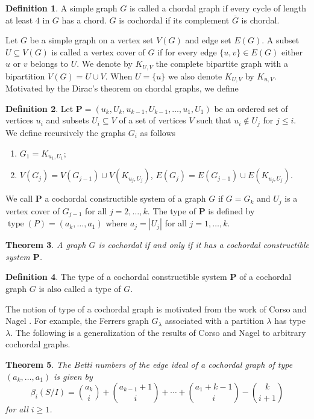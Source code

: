 \documentclass[12pt,amscd]{amsart}
\newtheorem{thm}{Theorem}[section]
\theoremstyle{definition}
\newtheorem{defn}[thm]{Definition}
\numberwithin{equation}{section}
\DeclareMathOperator{\type}{type}
\def\P {\mathbf P}
\begin{document}
\begin{defn}
    A simple graph $G$ is called a chordal graph if every cycle of length at least $4$ in $G$ has a chord. $G$ is cochordal if its complement $\overline{G}$ is chordal.
\end{defn}
Let $G$ be a simple graph on a vertex set $V(G)$ and edge set $E(G)$. A subset $U \subseteq V(G)$ is called a vertex cover of $G$ if for every edge $\{u,v\} \in E(G)$ either $u$ or $v$ belongs to $U$. We denote by $K_{U,V}$ the complete bipartite graph with a bipartition $V(G) = U \cup V$. When $U = \{u\}$ we also denote $K_{U,V}$ by $K_{u,V}$. Motivated by the Dirac's theorem \cite{Di} on chordal graphs, we define
\begin{defn} Let $\P = (u_k,U_k, u_{k-1}, U_{k-1}, \ldots, u_1, U_1)$ be an ordered set of vertices $u_i$ and subsets $U_i \subseteq V$ of a set of vertices $V$ such that $u_i \notin U_j$ for $j \le i$. We define recursively the graphs $G_i$ as follows
\begin{enumerate}
    \item $G_1 = K_{u_1,U_1}$;
    \item $V(G_j) = V(G_{j-1}) \cup V(K_{u_j,U_j})$, $E(G_j) = E(G_{j-1}) \cup E(K_{u_j,U_j})$.
\end{enumerate} 
We call $\P$ a cochordal constructible system of a graph $G$ if $G = G_k$ and $U_j$ is a vertex cover of $G_{j-1}$ for all $j = 2, \ldots, k$. The type of $\P$ is defined by $\type(P) = (a_k, \ldots, a_1)$ where $a_j = |U_j|$ for all $j = 1, \ldots, k$.
\end{defn}

\begin{thm}\label{thm_cochordal_constructible} A graph $G$ is cochordal if and only if it has a cochordal constructible system $\P$. 
\end{thm}
\begin{defn}
    The type of a cochordal constructible system $\P$ of a cochordal graph $G$ is also called a type of $G$.
\end{defn}
The notion of type of a cochordal graph is motivated from the work of Corso and Nagel \cite{CN1, CN2}. For example, the Ferrers graph $G_\lambda$ associated with a partition $\lambda$ has type $\lambda$. The following is a generalization of the results of Corso and Nagel to arbitrary cochordal graphs.

\begin{thm}\label{thm_betti} The Betti numbers of the edge ideal of a cochordal graph of type $(a_k, \ldots, a_1)$ is given by 
$$\beta_i(S/I) = \binom{a_k}{i} + \binom{a_{k-1}+1}{i} + \cdots + \binom{a_1 + k-1}{i} - \binom{k}{i+1}$$
for all $i \ge 1$.
\end{thm}
\end{document}
